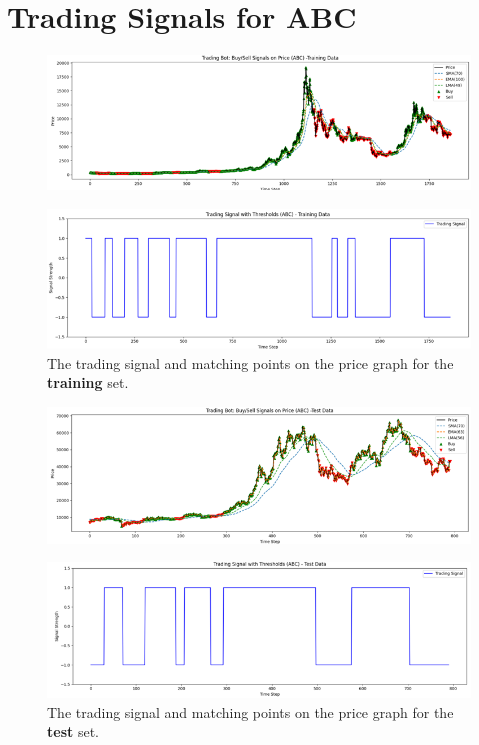 \documentclass[a4paper, 12pt]{extarticle}
\begin{document}
\newpage
\section{Trading Signals for ABC}
\begin{figure}[h!]
    \centering
    \includegraphics[width=\textwidth]{./assets/abc_train.png}
\end{figure}
\begin{figure}[h!]
    \centering
    \includegraphics[width=\textwidth]{./assets/abc_train_signal.png}
    \caption{The trading signal and matching points on the price graph for the \textbf{training} set.}
\end{figure}
\newpage
\begin{figure}[h!]
    \centering
    \includegraphics[width=\textwidth]{./assets/abc_test.png}
\end{figure}
\begin{figure}[h!]
    \centering
    \includegraphics[width=\textwidth]{./assets/abc_test_signal.png}
    \caption{The trading signal and matching points on the price graph for the \textbf{test} set.}
\end{figure}
\end{document}
